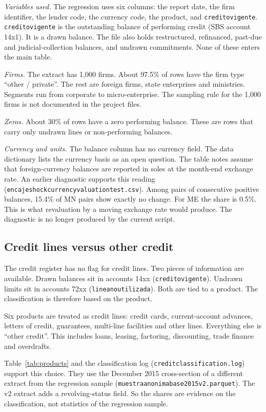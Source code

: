 \documentclass[11pt]{article}
\newcommand{\code}[1]{\texttt{#1}}
\renewcommand{\_}{\origunderscore\hspace{0pt}}  %
\begin{document}
\textit{Variables used.}
The regression uses six columns: the report date, the firm identifier, the lender code, the currency code, the product, and \code{credito\_vigente}.
\code{credito\_vigente} is the outstanding balance of performing credit (SBS account 14x1).
It is a drawn balance.
The file also holds restructured, refinanced, past-due and judicial-collection balances, and undrawn commitments.
None of these enters the main table.

\textit{Firms.}
The extract has 1,000 firms.
About 97.5\% of rows have the firm type ``other / private''.
The rest are foreign firms, state enterprises and ministries.
Segments run from corporate to micro-enterprise.
The sampling rule for the 1,000 firms is not documented in the project files.

\textit{Zeros.}
About 30\% of rows have a zero performing balance.
These are rows that carry only undrawn lines or non-performing balances.

\textit{Currency and units.}
The balance column has no currency field.
The data dictionary lists the currency basis as an open question.
The table notes assume that foreign-currency balances are reported in soles at the month-end exchange rate.
An earlier diagnostic supports this reading (\code{encaje\_shock\_currency\_valuation\_test.csv}).
Among pairs of consecutive positive balances, 15.4\% of MN pairs show exactly no change.
For ME the share is 0.5\%.
This is what revaluation by a moving exchange rate would produce.
The diagnostic is no longer produced by the current script.

\subsection{Credit lines versus other credit}
\label{sec:classification}

The credit register has no flag for credit lines.
Two pieces of information are available.
Drawn balances sit in accounts 14xx (\code{credito\_vigente}).
Undrawn limits sit in accounts 72xx (\code{linea\_no\_utilizada}).
Both are tied to a product.
The classification is therefore based on the product.

Six products are treated as credit lines: credit cards, current-account advances, letters of credit, guarantees, multi-line facilities and other lines.
Everything else is ``other credit''.
This includes loans, leasing, factoring, discounting, trade finance and overdrafts.

Table~\ref{tab:products} and the classification log (\code{credit\_classification.log}) support this choice.
They use the December 2015 cross-section of a different extract from the regression sample (\code{muestra\_anonima\_base2015\_v2.parquet}).
The v2 extract adds a revolving-status field.
So the shares are evidence on the classification, not statistics of the regression sample.
\end{document}
